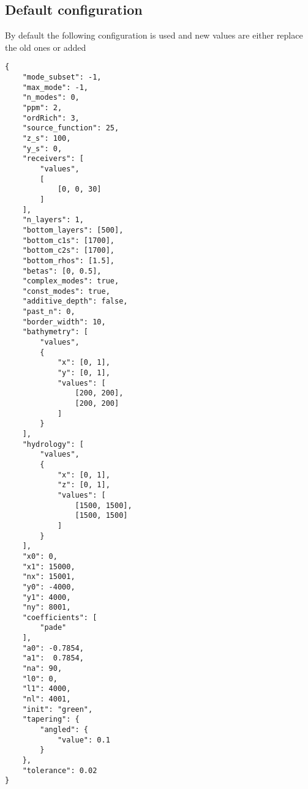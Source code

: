 \documentclass[12pt]{extarticle}
\begin{document}
        \subsection{Default configuration}
            \par By default the following configuration is used and new values are either replace the old ones or added
            \begin{verbatim}
{
    "mode_subset": -1,
    "max_mode": -1,
    "n_modes": 0,
    "ppm": 2,
    "ordRich": 3,
    "source_function": 25,
    "z_s": 100,
    "y_s": 0,
    "receivers": [
        "values",
        [
            [0, 0, 30]
        ]
    ],
    "n_layers": 1,
    "bottom_layers": [500],
    "bottom_c1s": [1700],
    "bottom_c2s": [1700],
    "bottom_rhos": [1.5],
    "betas": [0, 0.5],
    "complex_modes": true,
    "const_modes": true,
    "additive_depth": false,
    "past_n": 0,
    "border_width": 10,
    "bathymetry": [
        "values",
        {
            "x": [0, 1],
            "y": [0, 1],
            "values": [
                [200, 200],
                [200, 200]
            ]
        }
    ],
    "hydrology": [
        "values",
        {
            "x": [0, 1],
            "z": [0, 1],
            "values": [
                [1500, 1500],
                [1500, 1500]
            ]
        }
    ],
    "x0": 0,
    "x1": 15000,
    "nx": 15001,
    "y0": -4000,
    "y1": 4000,
    "ny": 8001,
    "coefficients": [
        "pade"
    ],
    "a0": -0.7854,
    "a1":  0.7854,
    "na": 90,
    "l0": 0,
    "l1": 4000,
    "nl": 4001,
    "init": "green",
    "tapering": {
        "angled": {
            "value": 0.1
        }
    },
    "tolerance": 0.02
}
            \end{verbatim}
\end{document}

